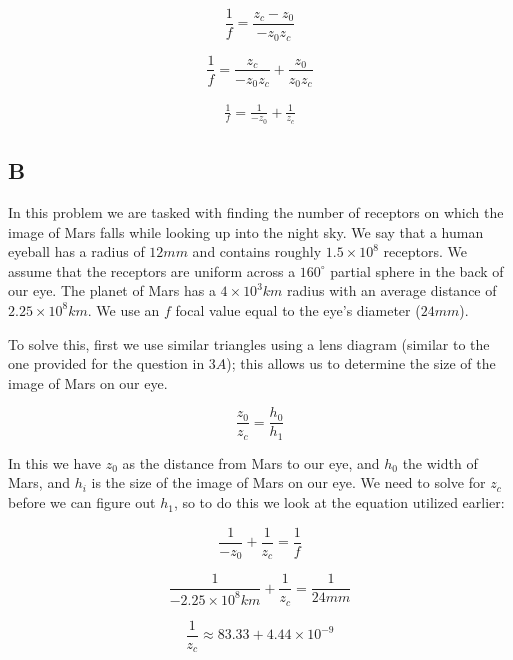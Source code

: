 \documentclass{article}
\begin{document}
\begin {equation}
    \frac{1}{f} = \frac{z_c - z_0}{-z_0 z_c}
\end{equation}

\begin{equation}
    \frac{1}{f} = \frac{z_c}{-z_0 z_c} + \frac{z_0}{z_0 z_c}
\end{equation}

\begin{eqnarray}
    \frac{1}{f} = \frac{1}{-z_0} + \frac{1}{z_c}
\end{eqnarray}

\subsection*{B}

In this problem we are tasked with finding the number of receptors on which the image of Mars falls while looking up into the night sky. We say that a human eyeball has a radius of $12mm$ and contains roughly $1.5\times10^8$ receptors. We assume that the receptors are uniform across a $160^\circ$ partial sphere in the back of our eye. The planet of Mars has a $4\times10^3km$ radius with an average distance of $2.25\times10^8km$. We use an $f$ focal value equal to the eye's diameter ($24mm$).

To solve this, first we use similar triangles using a lens diagram (similar to the one provided for the question in $3A$); this allows us to determine the size of the image of Mars on our eye.

\begin{equation}
    \frac{z_0}{z_c} = \frac{h_0}{h_1}
\end{equation}

\noindent In this we have $z_0$ as the distance from Mars to our eye, and $h_0$ the width of Mars, and $h_i$ is the size of the image of Mars on our eye. We need to solve for $z_c$ before we can figure out $h_1$, so to do this we look at the equation utilized earlier:

\begin{equation}
    \frac{1}{-z_0}+\frac{1}{z_c}=\frac{1}{f}
\end{equation}

\begin{equation}
    \frac{1}{-2.25\times10^8km}+\frac{1}{z_c}=\frac{1}{24mm}
\end{equation}

\begin{equation}
    \frac{1}{z_c} \approx 83.33 + 4.44\times10^{-9}
\end{equation}
\end{document}
